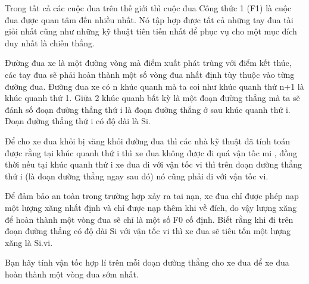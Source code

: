 Trong tất cả các cuộc đua trên thế giới thì cuộc đua Công thức 1 (F1) là cuộc đua được quan tâm đến nhiều nhất. Nó tập hợp được tất cả những tay đua tài giỏi nhất cũng như những kỹ thuật tiên tiến nhất để phục vụ cho một mục đích duy nhất là chiến thắng.

Đường đua xe là một đường vòng mà điểm xuất phát trùng với điểm kết thúc, các tay đua sẽ phải hoàn thành một số vòng đua nhất định tùy thuộc vào từng đường đua. Đường đua xe có n khúc quanh mà ta coi như khúc quanh thứ n+1 là khúc quanh thứ 1. Giữa 2 khúc quanh bất kỳ là một đoạn đường thẳng mà ta sẽ đánh số đoạn đường thẳng thứ i là đoạn đường thẳng ở sau khúc quanh thứ i. Đoạn đường thẳng thứ i có độ dài là Si.

Để cho xe đua khỏi bị văng khỏi đường đua thì các nhà kỹ thuật đã tính toán được rằng tại khúc quanh thứ i thì xe đua không được đi quá vận tốc mi , đồng thời nếu tại khúc quanh thứ i xe đua đi với vận tốc vi thì trên đoạn đường thẳng thứ i (là đoạn đường thẳng ngay sau đó) nó cũng phải đi với vận tốc vi.

Để đảm bảo an toàn trong trường hợp xảy ra tai nạn, xe đua chỉ được phép nạp một lượng xăng nhất định và chỉ được nạp thêm khi về đích, do vậy lượng xăng để hoàn thành một vòng đua sẽ chỉ là một số F0 cố định. Biết rằng khi đi trên đoạn đường thẳng có độ dài Si với vận tốc vi thì xe đua sẽ tiêu tốn một lượng xăng là Si.vi.

Bạn hãy tính vận tốc hợp lí trên mỗi đoạn đường thẳng cho xe đua để xe đua hoàn thành một vòng đua sớm nhất.